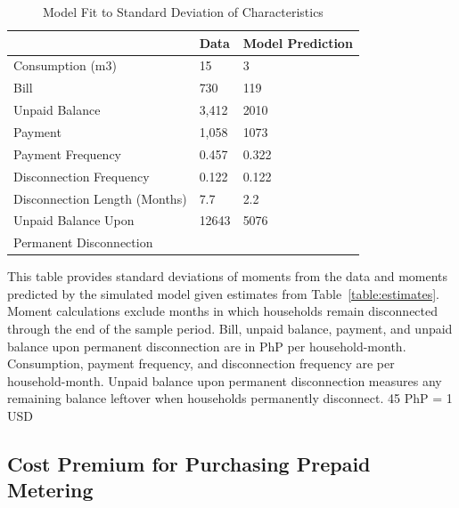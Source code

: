\documentclass[12pt]{article}
\begin{document}
\begin{table}[H]
\centering
\caption{Model Fit to Standard Deviation of Characteristics}\label{table:fitsd}
\begin{threeparttable}
\begin{tabular}{@{}l*{1}{KK}@{}}
\toprule
 & Data & Model Prediction \\
\midrule
Consumption (m3) & 15 & 3  \\
Bill &  730 & 119  \\
Unpaid Balance &  3,412  &  2010  \\
Payment &  1,058 &  1073 \\
Payment Frequency &  0.457 &  0.322  \\
Disconnection Frequency &  0.122  &  0.122 \\
Disconnection Length (Months) & 7.7 & 2.2  \\
Unpaid Balance Upon &  12643 &  5076  \\[-.5em]
Permanent Disconnection \\
\bottomrule
\end{tabular}
\begin{tablenotes}
\item 
\footnotesize
This table provides standard deviations of moments from the data and moments predicted by the simulated model given estimates from Table~\ref{table:estimates}.  Moment calculations exclude months in which households remain disconnected through the end of the sample period.  Bill, unpaid balance, payment, and unpaid balance upon permanent disconnection are in PhP per household-month.  Consumption, payment frequency, and disconnection frequency are per household-month.  Unpaid balance upon permanent disconnection measures any remaining balance leftover when households permanently disconnect.    45 PhP = 1 USD
\end{tablenotes}
\end{threeparttable}

\end{table}

\subsection{Cost Premium for Purchasing Prepaid Metering}\label{appendix:prepaidcosts}
\end{document}
